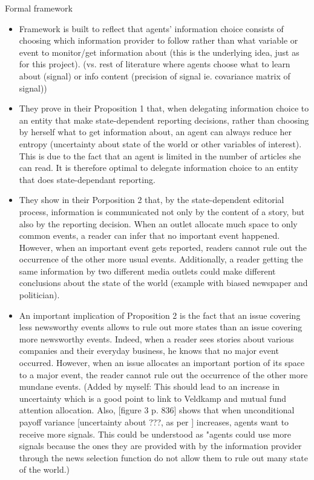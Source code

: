 Formal framework
\begin{itemize}
    \item Framework is built to reflect that agents' information choice consists of choosing which information provider to follow rather than what variable or event to monitor/get information about (this is the underlying idea, just as for this project). (vs. rest of literature where agents choose what to learn about (signal) or info content (precision of signal ie. covariance matrix of signal))
    \item They prove in their Proposition 1 that, when delegating information choice to an entity that make state-dependent reporting decisions, rather than choosing by herself what to get information about, an agent can always reduce her entropy (uncertainty about state of the world or other variables of interest). This is due to the fact that an agent is limited in the number of articles she can read. It is therefore optimal to delegate information choice to an entity that does state-dependant reporting.
    \item They show in their Porposition 2 that, by the state-dependent editorial process, information is communicated not only by the content of a story, but also by the reporting decision. When an outlet allocate much space to only common events, a reader can infer that no important event happened. However, when an important event gets reported, readers cannot rule out the occurrence of the other more usual events.
    Additionally, a reader getting the same information by two different media outlets could make different conclusions about the state of the world (example with biased newspaper and politician).
    \item An important implication of Proposition 2 is the fact that an issue covering less newsworthy events allows to rule out more states than an issue covering more newsworthy events. Indeed, when a reader sees stories about various companies and their everyday business, he knows that no major event occurred. However, when an issue allocates an important portion of its space to a major event, the reader cannot rule out the occurrence of the other more mundane events. (Added by myself: This should lead to an increase in uncertainty which is a good point to link to Veldkamp and mutual fund attention allocation. Also, \textcite{Veldkamp2006a} [figure 3 p. 836] shows that when unconditional payoff variance [uncertainty about ???, as per \textcite{Veldkamp2006}] increases, agents want to receive more signals. This could be understood as "agents could use more signals because the ones they are provided with by the information provider through the news selection function do not allow them to rule out many state of the world.)

\end{itemize}
